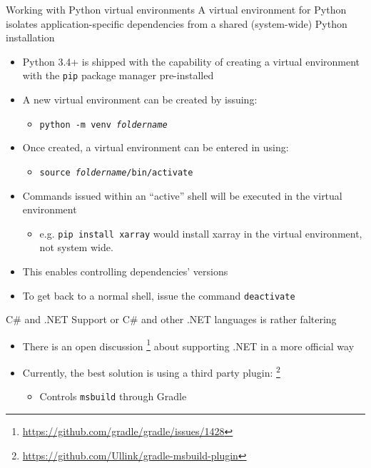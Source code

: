 \documentclass[presentation]{beamer}
\newcommand{\fnurl}[1]{\footnote{\url{#1}}}
\begin{document}
\begin{frame}[fragile]{Working with Python virtual environments}
    A virtual environment for Python isolates application-specific dependencies from a shared (system-wide) Python installation
    \begin{itemize}
        \item Python 3.4+ is shipped with the capability of creating a virtual environment with the \texttt{pip} package manager pre-installed
        \item A new virtual environment can be created by issuing:
        \begin{itemize}
            \item \texttt{python -m venv \textit{foldername}}
        \end{itemize}
        \item Once created, a virtual environment can be entered in using:
        \begin{itemize}
            \item \texttt{source \textit{foldername}/bin/activate}
        \end{itemize}
        \item Commands issued within an ``active'' shell will be executed in the virtual environment
        \begin{itemize}
            \item e.g. \texttt{pip install xarray} would install xarray in the virtual environment, not system wide.
        \end{itemize}
        \item This enables controlling dependencies' versions
        \item To get back to a normal shell, issue the command \texttt{deactivate}
    \end{itemize}
\end{frame}

\begin{frame}[fragile]{C\# and .NET}
    Support or C\# and other .NET languages is rather faltering
    \begin{itemize}
        \item There is an open discussion \fnurl{https://github.com/gradle/gradle/issues/1428} about supporting .NET in a more official way
        \item Currently, the best solution is using a third party plugin: \fnurl{https://github.com/Ullink/gradle-msbuild-plugin}
        \begin{itemize}
            \item Controls \texttt{msbuild} through Gradle
        \end{itemize}
    \end{itemize}
\end{frame}
\end{document}
